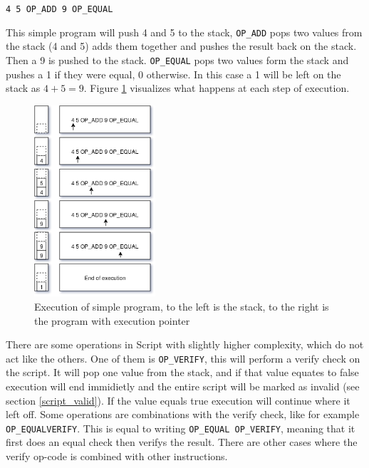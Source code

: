 \texttt{4 5 OP\_ADD 9 OP\_EQUAL}

This simple program will push 4 and 5 to the stack, \texttt{OP\_ADD}\cite{script_wiki} pops two values from the stack (4 and 5) adds them together and pushes the result back on the stack. Then a 9 is pushed to the stack. \texttt{OP\_EQUAL}\cite{script_wiki} pops two values form the stack and pushes a 1 if they were equal, 0 otherwise. In this case a 1 will be left on the stack as $4 + 5 = 9$. Figure \ref{fig:script} visualizes what happens at each step of execution.
\\
\begin{figure}[H]
	\centering
	\includegraphics[width=0.4\textwidth]{background/images/script.png}
	\caption{Execution of simple program, to the left is the stack, to the right is the program with execution pointer}
	\label{fig:script}
\end{figure}


There are some operations in Script with slightly higher complexity, which do not act like the others. One of them is \texttt{OP\_VERIFY}, this will perform a verify check on the script. It will pop one value from the stack, and if that value equates to false execution will end immidietly and the entire script will be marked as invalid (see section \ref{script_valid}).\cite{antonopoulos_2017}\cite{script_wiki} If the value equals true execution will continue where it left off. Some operations are combinations with the verify check, like for example \texttt{OP\_EQUALVERIFY}. This is equal to writing \texttt{OP\_EQUAL OP\_VERIFY}, meaning that it first does an equal check then verifys the result. There are other cases where the verify op-code is combined with other instructions.


